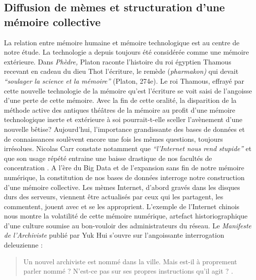 \subsection[Diffusion de mèmes et structuration d{\textquoteright}une mémoire collective]{Diffusion de mèmes et structuration d{\textquoteright}une mémoire collective}
La relation entre mémoire humaine et mémoire technologique est au centre de notre étude. La technologie a depuis toujours été considérée comme une mémoire extérieure. Dans \textit{Phèdre, }Platon raconte l{\textquoteright}histoire du roi égyptien Thamous recevant en cadeau du dieu Thot l{\textquoteright}écriture, le remède (\textit{pharmakon) }qui devait \textit{{\textquotedblleft}soulager la science et la mémoire{\textquotedblright} }(Platon, 274e). Le roi Thamous, effrayé par cette nouvelle technologie de la mémoire qu{\textquoteright}est l{\textquoteright}écriture se voit saisi de l{\textquoteright}angoisse d{\textquoteright}une perte de cette mémoire. Avec la fin de cette oralité, la disparition de la méthode active des antiques thé\^atres de la mémoire au profit d{\textquoteright}une mémoire technologique inerte et extérieure à soi pourrait-t-elle sceller l{\textquoteright}avènement d{\textquoteright}une nouvelle bêtise? Aujourd{\textquoteright}hui, l{\textquoteright}importance grandissante des bases de données et de connaissances soulèvent encore une fois les mêmes questions, toujours irrésolues. Nicolas Carr constate notamment que \textit{{\textquotedblleft}l{\textquoteright}Internet nous rend stupide{\textquotedblright}} et que son usage répété entraine une baisse drastique de nos facultés de concentration \citep{Carr2010}. A l{\textquoteright}ère du Big Data et de l{\textquoteright}expansion sans fin de notre mémoire numérique, la constitution de nos bases de données interroge notre construction d{\textquoteright}une mémoire collective. Les mèmes Internet, d{\textquoteright}abord gravés dans les disques durs des serveurs, viennent être actualisés par ceux qui les partagent, les commentent, jouent avec et se les approprient. L{\textquoteright}exemple de l{\textquoteright}Internet chinois nous montre la volatilité de cette mémoire numérique, artefact historiographique d{\textquoteright}une culture soumise au bon-vouloir des administrateurs du réseau. Le \textit{Manifeste de l{\textquoteright}Archiviste} publié par Yuk Hui \citeyear{Hui2014} s{\textquoteright}ouvre sur l{\textquoteright}angoissante interrogation deleuzienne :  

\begin{quote}
Un nouvel archiviste est nommé dans la ville. Mais est-il à proprement parler nommé ?
N'est-ce pas sur ses propres instructions qu'il agit ? 
\citep{Deleuze1972a}.
\end{quote}

